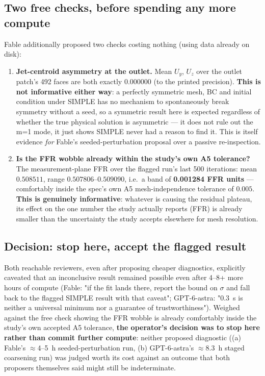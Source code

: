 \documentclass[11pt]{article}
\begin{document}
\subsection*{Two free checks, before spending any more compute}
Fable additionally proposed two checks costing nothing (using data already on disk):
\begin{enumerate}
\item \textbf{Jet-centroid asymmetry at the outlet.} Mean $U_y$, $U_z$ over the outlet patch's 492
faces are both exactly $0.000000$ (to the printed precision). \textbf{This is not informative either
way}: a perfectly symmetric mesh, BC and initial condition under SIMPLE has no mechanism to
spontaneously break symmetry without a seed, so a symmetric result here is expected regardless of
whether the true physical solution is asymmetric --- it does not rule out the m=1 mode, it just shows
SIMPLE never had a reason to find it. This is itself evidence \emph{for} Fable's seeded-perturbation
proposal over a passive re-inspection.
\item \textbf{Is the FFR wobble already within the study's own A5 tolerance?} The measurement-plane
FFR over the flagged run's last 500 iterations: mean $0.508511$, range $0.507806$--$0.509090$, i.e.\ a
band of \textbf{0.001284 FFR units} --- comfortably inside the spec's own A5 mesh-independence
tolerance of $0.005$. \textbf{This is genuinely informative}: whatever is causing the residual
plateau, its effect on the one number the study actually reports (FFR) is already smaller than the
uncertainty the study accepts elsewhere for mesh resolution.
\end{enumerate}

\subsection*{Decision: stop here, accept the flagged result}
Both reachable reviewers, even after proposing cheaper diagnostics, explicitly caveated that an
inconclusive result remained possible even after 4--8+ more hours of compute (Fable: "if the fit
lands there, report the bound on $\sigma$ and fall back to the flagged SIMPLE result with that
caveat"; GPT-6-astra: "0.3~s is neither a universal minimum nor a guarantee of trustworthiness").
Weighed against the free check showing the FFR wobble is already comfortably inside the study's own
accepted A5 tolerance, \textbf{the operator's decision was to stop here rather than commit further
compute}: neither proposed diagnostic ((a) Fable's $\approx$4--5~h seeded-perturbation run, (b)
GPT-6-astra's $\approx$8.3~h staged coarsening run) was judged worth its cost against an outcome that
both proposers themselves said might still be indeterminate.
\end{document}
